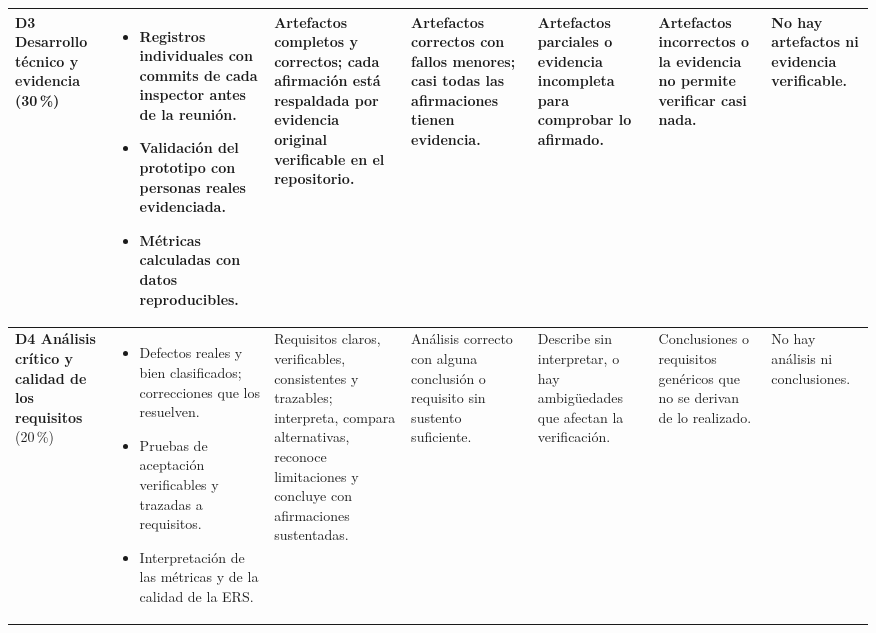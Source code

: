 \documentclass[11pt]{article}
\begin{document}
\begin{landscape}
{\begin{longtable}{|L{2.4cm}|L{5.6cm}|L{3.1cm}|L{2.8cm}|L{2.8cm}|L{2.7cm}|L{2.1cm}|}
	\hline
	\textbf{D3 Desarrollo técnico y evidencia} (30\,\%) & \begin{itemize}[leftmargin=9pt,itemsep=0pt,topsep=0pt,parsep=0pt,partopsep=0pt,after=\vspace{-\baselineskip}]\item Registros individuales con commits de cada inspector antes de la reunión.\item Validación del prototipo con personas reales evidenciada.\item Métricas calculadas con datos reproducibles.\end{itemize} & Artefactos completos y correctos; cada afirmación está respaldada por evidencia original verificable en el repositorio. & Artefactos correctos con fallos menores; casi todas las afirmaciones tienen evidencia. & Artefactos parciales o evidencia incompleta para comprobar lo afirmado. & Artefactos incorrectos o la evidencia no permite verificar casi nada. & No hay artefactos ni evidencia verificable.\\
	\hline
	\textbf{D4 Análisis crítico y calidad de los requisitos} (20\,\%) & \begin{itemize}[leftmargin=9pt,itemsep=0pt,topsep=0pt,parsep=0pt,partopsep=0pt,after=\vspace{-\baselineskip}]\item Defectos reales y bien clasificados; correcciones que los resuelven.\item Pruebas de aceptación verificables y trazadas a requisitos.\item Interpretación de las métricas y de la calidad de la ERS.\end{itemize} & Requisitos claros, verificables, consistentes y trazables; interpreta, compara alternativas, reconoce limitaciones y concluye con afirmaciones sustentadas. & Análisis correcto con alguna conclusión o requisito sin sustento suficiente. & Describe sin interpretar, o hay ambigüedades que afectan la verificación. & Conclusiones o requisitos genéricos que no se derivan de lo realizado. & No hay análisis ni conclusiones.\\
	\hline

\end{longtable}}
\end{landscape}
\end{document}
